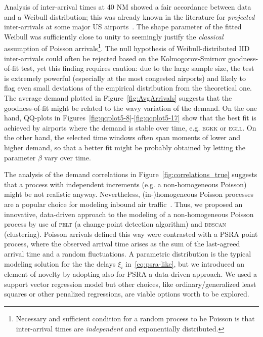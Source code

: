 \documentclass[draft,review]{elsarticle}
\makeatletter
\newcommand*{\eg}{e.g.\@\xspace}
\newcommand{\PELT}{\textsc{pelt}}
\newcommand{\DBSCAN}{\textsc{dbscan}}
\newcommand{\airp}[1]{\textcolor{#1}{\textsc{#1}}}
\makeatother
\begin{document}
  Analysis of inter-arrival times at 40 NM showed a fair accordance between data and a Weibull distribution; this was already known in the literature for \emph{projected} inter-arrivals at some major US airports~\citep{willemain2004statistical}.
  The shape parameter of the fitted Weibull was sufficiently close to unity to seemingly justify the \emph{classical} assumption of Poisson arrivals\footnote{Necessary and sufficient condition for a random process to be Poisson is that inter-arrival times are \emph{independent} and exponentially distributed.}.
  The null hypothesis of Weibull-distributed \ac{IID} inter-arrivals could often be rejected based on the Kolmogorov-Smirnov goodness-of-fit test, yet this finding requires caution: due to the large sample size, the test is extremely powerful (especially at the most congested airports) and likely to flag even small deviations of the empirical distribution from the theoretical one.
  The average demand plotted in Figure~\ref{fig:AvgArrivals} suggests that the goodness-of-fit might be related to the wavy variation of the demand.
  On the one hand, QQ-plots in Figures~\ref{fig:qqplot5-8}-\ref{fig:qqplot5-17} show that the best fit is achieved by airports where the demand is stable over time, \eg{} \airp{egkk} or \airp{egll}.
  On the other hand, the selected time windows often span moments of lower and higher demand, so that a better fit might be probably obtained by letting the parameter $\beta$ vary over time.

  The analysis of the demand correlations in Figure~\ref{fig:correlations_true} suggests that a process with independent increments (\eg{} a non-homogeneous Poisson) might be not realistic anyway.
  Nevertheless, (in-)homogeneous Poisson processes are a popular choice for modeling inbound air traffic~\citep{gwiggner2014data}.
  Thus, we proposed an innovative, data-driven approach to the modeling of a non-homogeneous Poisson process by use of \PELT{} (a change-point detection algorithm) and \DBSCAN{} (clustering).
  Poisson arrivals defined this way were contrasted with a \ac{PSRA} point process, where the observed arrival time arises as the sum of the last-agreed arrival time and a random fluctuations.
  A parametric distribution is the typical modeling solution for the the delays \(\xi_i\) in~\eqref{eq:psra-like}, but we introduced an element of novelty by adopting also for \ac{PSRA} a data-driven approach.
  We used a support vector regression model but other choices, like ordinary/generalized least squares or other penalized regressions, are viable options worth to be explored.
\end{document}
